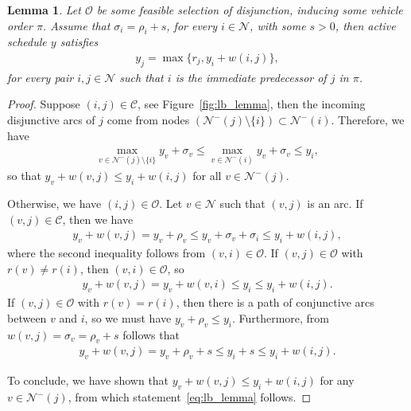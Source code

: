 \documentclass[a4paper]{article}
\theoremstyle{definition}
\theoremstyle{plain}
\newtheorem{lemma}{Lemma}
\begin{document}
\begin{lemma}\label{lb_lemma}
  Let $\mathcal{O}$ be some feasible selection of disjunction, inducing some
  vehicle order $\pi$. Assume that $\sigma_{i} = \rho_{i} + s$, for every
  $i \in \mathcal{N}$, with some $s > 0$, then active schedule $y$ satisfies
\begin{align}
  \label{eq:lb_lemma}
  y_{j} = \max \{ r_{j}, y_i + w(i, j) \} ,
\end{align}
for every pair $i,j \in \mathcal{N}$ such that $i$ is the immediate predecessor
of $j$ in $\pi$.
\end{lemma}
\begin{proof}
  Suppose $(i,j) \in \mathcal{C}$, see Figure~\ref{fig:lb_lemma}, then the incoming disjunctive
  arcs of $j$ come from nodes $(\mathcal{N}^{-}(j) \setminus \{ i \}) \subset \mathcal{N}^{-}(i)$.
  Therefore, we have
  \begin{align*}
    \max_{v \in \mathcal{N}^{-}(j) \setminus \{i\}} y_v + \sigma_{v} \leq \max_{v \in \mathcal{N}^{-}(i)} y_{v} + \sigma_{v} \leq y_{i} ,
  \end{align*}
  so that
      $y_{v} + w(v,j) \leq y_{i} + w(i,j)$
  for all $v \in \mathcal{N}^{-}(j)$.

  Otherwise, we have $(i, j) \in \mathcal{O}$.
  Let $v \in \mathcal{N}$ such that $(v, j)$ is an arc.
  If $(v,j) \in \mathcal{C}$, then we have
  \begin{align*}
    y_{v} + w(v,j) =
    y_{v} + \rho_{v} \leq y_{v} + \sigma_{v} + \sigma_{i} \leq y_{i} + w(i,j) ,
  \end{align*}
  where the second inequality follows from $(v,i) \in \mathcal{O}$.
  If $(v, j) \in \mathcal{O}$ with $r(v) \neq r(i)$, then $(v,i) \in \mathcal{O}$, so
  \begin{align*}
    y_{v} + w(v, j) = y_{v} + w(v, i) \leq y_{i} \leq y_{i} + w(i,j) .
  \end{align*}
  If $(v, j) \in \mathcal{O}$ with $r(v) = r(i)$, then there is a path of conjunctive arcs between $v$ and
  $i$, so we must have $y_{v} + \rho_{v} \leq y_{i}$.
  Furthermore, from $w(v,j) = \sigma_{v} = \rho_{v} + s$ follows that
  \begin{align*}
    y_{v} + w(v,j) = y_{v} + \rho_{v} + s \leq y_{i} + s \leq y_{i} + w(i, j) .
  \end{align*}

  To conclude, we have shown that
  $y_{v} + w(v,j) \leq y_{i} + w(i,j)$ for any
  $v \in \mathcal{N}^{-}(j)$, from which statement~\eqref{eq:lb_lemma} follows.
\end{proof}
\end{document}
